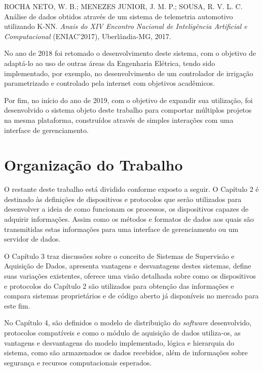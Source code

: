 \begin{alineascomponto}
\item ROCHA NETO, W. B.; MENEZES JUNIOR, J. M. P.; SOUSA, R. V. L. C.
Análise de dados obtidos através de um sistema de telemetria automotivo utilizando K-NN.\textit{ Anais do XIV Encontro Nacional de Inteligência Artificial e
Computacional} (ENIAC’2017), Uberlândia-MG, 2017.
\end{alineascomponto}

No ano de 2018 foi retomado o desenvolvimento deste sistema, com o objetivo de adaptá-lo ao uso de outras áreas da Engenharia Elétrica, tendo sido implementado, por exemplo, no desenvolvimento de um controlador de irrigação parametrizado e controlado pela internet com objetivos acadêmicos.

Por fim, no início do ano de 2019, com o objetivo de expandir sua utilização, foi desenvolvido o sistema objeto deste trabalho para comportar múltiplos projetos na mesma plataforma, construídos através de simples interações com uma interface de gerenciamento.


\section{Organização do Trabalho}
\label{sec:organizacao-trabalho}

O restante deste trabalho está dividido conforme exposto a seguir. O Capítulo 2 é destinado às definições de dispositivos e protocolos que serão utilizados para desenvolver a ideia de como funcionam os processos, os dispositivos capazes de adquirir informações. Assim como os métodos e formatos de dados aos quais são transmitidas estas informações para uma interface de gerenciamento ou um servidor de dados.

O Capítulo 3 traz discussões sobre o conceito de Sistemas de Supervisão e Aquisição de Dados, apresenta vantagens e desvantagens destes sistemas, define suas variações existentes, oferece uma visão detalhada sobre como os dispositivos e protocolos do Capítulo 2 são utilizados para obtenção das informações e compara sistemas proprietários e de código aberto já disponíveis no mercado para este fim.

No Capítulo 4, são definidos o modelo de distribuição do \textit{software} desenvolvido, protocolos compatíveis e como o módulo de aquisição de dados utiliza-os, as vantagens e desvantagens do modelo implementado, lógica e hierarquia do sistema, como são armazenados os dados recebidos, além de informações sobre segurança e recursos computacionais esperados.

